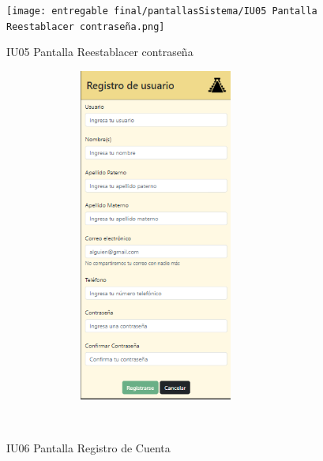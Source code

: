 \begin{figure}[htb]
    \begin{minipage}{1\textwidth}
    \centering
    \texttt{[image: entregable final/pantallasSistema/IU05 Pantalla Reestablacer contraseña.png]}
    \caption{IU05 Pantalla Reestablacer contraseña}
\end{minipage}

    \begin{minipage}{1\textwidth}
        \centering
        \includegraphics[width=10cm, height=11cm]{entregable final/pantallasSistema/IU06 Pantalla Registro de Cuenta.png}
        \caption{IU06 Pantalla Registro de Cuenta}
    \end{minipage}
    \\
\end{figure}
